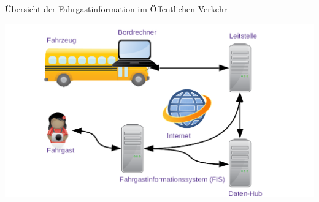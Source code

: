 
\begin{frame}{Übersicht der Fahrgastinformation im Öffentlichen Verkehr}
  \begin{center}
    \includegraphics[width=1.1\textwidth]{otm-june-2-2021/public-transport.png}
  \end{center}
\end{frame}
